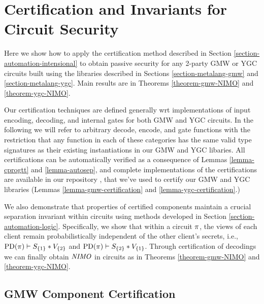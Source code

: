 \section{Certification and Invariants for Circuit Security}
\label{section-composition}

Here we show how to apply the certification method described in
Section \ref{section-automation-intensional} to obtain passive
security for any 2-party GMW or YGC circuits built using the libraries
described in Sections \ref{section-metalang-gmw} and
\ref{section-metalang-ygc}.  Main results are in Theorems
\ref{theorem-gmw-NIMO} and \ref{theorem-ygc-NIMO}.

Our certification techniques are defined generally wrt implementations
of input encoding, decoding, and internal gates for both GMW and YGC
circuits. In the following we will refer to arbitrary decode, encode,
and gate functions with the restriction that any function in each of
these categories has the same valid type signatures as their existing
instantiations in our GMW and YGC libaries. All certifications can be
automatically verified as a consequence of Lemmas \ref{lemma-cprogtt}
and \ref{lemma-autosep}, and complete implementations of the
certifications are available in our repository \cite{jpdf-github},
that we've used to certify our GMW and YGC libraries (Lemmas
\ref{lemma-gmw-certification} and \ref{lemma-ygc-certification}.)

We also demonstrate that properties of certified
components maintain a crucial separation invariant within circuits
using methods developed in Section \ref{section-automation-logic}.
Specifically, we show that within a circuit $\pi$, the views of each
client remain probabilistically independent of the other client's
secrets, i.e., $\mathrm{PD}(\pi) \vdash S_{\{1\}} * V_{\{2\}}$ and
$\mathrm{PD}(\pi) \vdash S_{\{2\}} * V_{\{1\}}$.
Through certification of decodings we can finally obtain $\mathit{NIMO}$ in
circuits as in Theorems \ref{theorem-gmw-NIMO} and
\ref{theorem-ygc-NIMO}.

\subsection{GMW Component Certification}
\label{section-gmw-certification}

